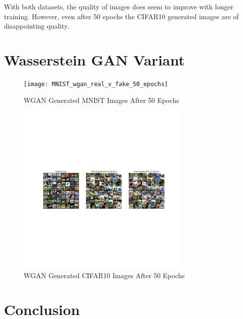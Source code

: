 \documentclass[letterpaper, 10pt]{article}
\begin{document}
With both datasets, the quality of images does seem to improve with longer training. However, even after 50 epochs the CIFAR10 generated 
images are of disappointing quality. 


\section{Wasserstein GAN Variant}

\begin{figure}[h]
\caption{WGAN Generated MNIST Images After 50 Epochs}
\centering
\texttt{[image: MNIST\_wgan\_real\_v\_fake\_50\_epochs]}
\end{figure}

\begin{figure}[h]
\caption{WGAN Generated CIFAR10 Images After 50 Epochs}
\centering
\includegraphics[width=0.75\textwidth]{cifar10_wgan_real_v_fake_50_epochs}
\end{figure}


\section{Conclusion}

\newpage


\end{document}
